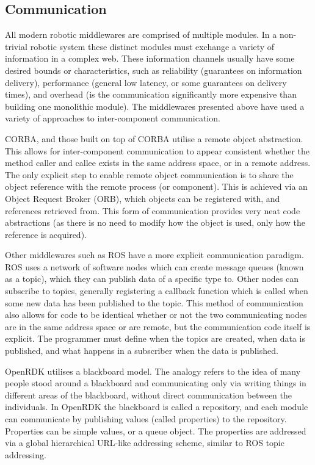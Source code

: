 \documentclass[../dissertation.tex]{subfiles}
\begin{document}
\subsection{Communication}

All modern robotic middlewares are comprised of multiple modules. In a non-trivial robotic system these distinct modules must exchange a variety of information in a complex web. These information channels usually have some desired bounds or characteristics, such as reliability (guarantees on information delivery), performance (general low latency, or some guarantees on delivery times), and overhead (is the communication significantly more expensive than building one monolithic module). The middlewares presented above have used a variety of approaches to inter-component communication.

CORBA, and those built on top of CORBA utilise a remote object abstraction. This allows for inter-component communication to appear consistent whether the method caller and callee exists in the same address space, or in a remote address. The only explicit step to enable remote object communication is to share the object reference with the remote process (or component). This is achieved via an Object Request Broker (ORB), which objects can be registered with, and references retrieved from. This form of communication provides very neat code abstractions (as there is no need to modify how the object is used, only how the reference is acquired).

Other middlewares such as ROS have a more explicit communication paradigm. ROS uses a network of software nodes which can create message queues (known as a topic), which they can publish data of a specific type to. Other nodes can subscribe to topics, generally registering a callback function which is called when some new data has been published to the topic. This method of communication also allows for code to be identical whether or not the two communicating nodes are in the same address space or are remote, but the communication code itself is explicit. The programmer must define when the topics are created, when data is published, and what happens in a subscriber when the data is published.

OpenRDK utilises a blackboard model. The analogy refers to the idea of many people stood around a blackboard and communicating only via writing things in different areas of the blackboard, without direct communication between the individuals. In OpenRDK the blackboard is called a repository, and each module can communicate by publishing values (called properties) to the repository. Properties can be simple values, or a queue object. The properties are addressed via a global hierarchical URL-like addressing scheme, similar to ROS topic addressing.
\end{document}
